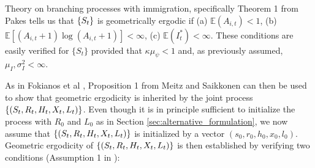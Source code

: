 \documentclass[review]{elsarticle}
\begin{document}
Theory on branching processes with immigration, specifically Theorem 1 from Pakes \cite{Pakes1971} tells us that $\{S_t\}$ is geometrically ergodic if (a) $\mathbb{E}(A_{i, t}) < 1$, (b) $\mathbb{E}[(A_{i, t} + 1)\log(A_{i, t} + 1)] < \infty$, (c) $\mathbb{E}(I^*_t) < \infty$. These conditions are easily verified for $\{S_t\}$ provided that $\kappa\mu_\psi < 1$ and, as previously assumed, $\mu_I, \sigma^2_I < \infty$.


As in Fokianos et al \cite{Fokianos2009}, Proposition 1 from Meitz and Saikkonen \cite{Meitz2008} can then be used to show that geometric ergodicity is inherited by the joint process $\{(S_t, R_t, H_t, X_t, L_t)\}$. %
Even though it is in principle sufficient to initialize the process with $R_0$ and $L_0$ as in Section \ref{sec:alternative_formulation}, we now assume that $\{(S_t, R_t, H_t, X_t, L_t)\}$ is initialized by a vector $(s_0, r_0, h_0, x_0, l_0)$. Geometric ergodicity of $\{(S_t, R_t, H_t, X_t, L_t)\}$ is then established by verifying two conditions (Assumption 1 in \cite{Meitz2008}):
\end{document}
